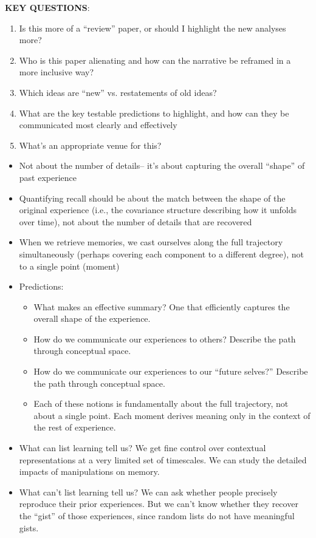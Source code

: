 \textbf{KEY QUESTIONS}:
\begin{enumerate}
  \item Is this more of a ``review'' paper, or should I highlight the new analyses more?
  \item Who is this paper alienating and how can the narrative be reframed in a more inclusive way?
  \item Which ideas are ``new'' vs. restatements of old ideas?
  \item What are the key testable predictions to highlight, and how can they be communicated most clearly and effectively
  \item What's an appropriate venue for this?
\end{enumerate}


\begin{itemize}
\item Not about the number of details-- it's about capturing the overall ``shape'' of past experience
\item Quantifying recall should be about the match between the shape of the original experience (i.e., the covariance structure describing how it unfolds over time), not about the number of details that are recovered
\item When we retrieve memories, we cast ourselves along the full trajectory simultaneously (perhaps covering each component to a different degree), not to a single point (moment)
\item Predictions:
\begin{itemize}
    \item What makes an effective summary?  One that efficiently captures the overall shape of the experience.
    \item How do we communicate our experiences to others?  Describe the path through conceptual space.
    \item How do we communicate our experiences to our ``future selves?''  Describe the path through conceptual space.
    \item Each of these notions is fundamentally about the full trajectory, not about a single point.  Each moment derives meaning only in the context of the rest of experience.
\end{itemize}
\item What can list learning tell us?  We get fine control over  contextual representations at a very limited set of timescales.  We can study the detailed impacts of manipulations on memory.
\item What can't list learning tell us?  We can ask whether people precisely reproduce their prior experiences.  But we can't know whether they recover the ``gist'' of those experiences, since random lists do not have meaningful gists.

\end{itemize}
